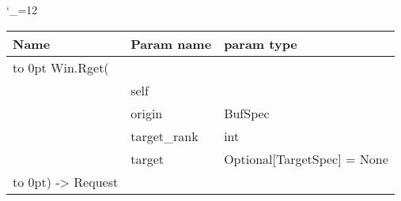 \begingroup \catcode`\_=12 \tt
\begin{tabular}{lll}
\toprule
\textrm{Name}&\textrm{Param name}&\textrm{param type}\\
\midrule
\hbox to 0pt {Win.Rget(\hss}\\
& self\\
& origin & BufSpec\\
& target_rank & int\\
& target & Optional[TargetSpec] = None\\
\hbox to 0pt{) -> Request\hss}\\
\bottomrule
\end{tabular}
\endgroup
